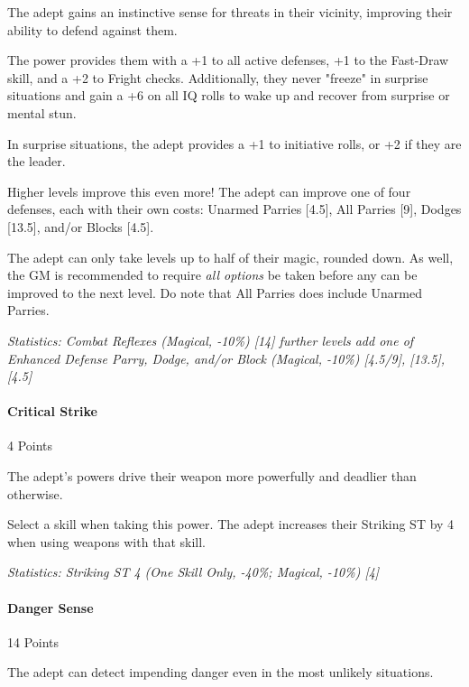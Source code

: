 \begin{multicols}{3}
	The adept gains an instinctive sense for threats in their vicinity, improving their ability to defend against them. 
	
	The power provides them with a +1 to all active defenses, +1 to the Fast-Draw skill, and a +2 to Fright checks. Additionally, they never "freeze" in surprise situations and gain a +6 on all IQ rolls to wake up and recover from surprise or mental stun.
	
	In surprise situations, the adept provides a +1 to initiative rolls, or +2 if they are the leader.
	
	Higher levels improve this even more! The adept can improve one of four defenses, each with their own costs: Unarmed Parries [4.5], All Parries [9], Dodges [13.5], and/or Blocks [4.5]. 
	
	The adept can only take levels up to half of their magic, rounded down. As well, the GM is recommended to require \textit{all options} be taken before any can be improved to the next level. Do note that All Parries does include Unarmed Parries.

	\textcolor{OliveGreen}{\textit{Statistics: Combat Reflexes (Magical, -10\%) [14] further levels add one of Enhanced Defense Parry, Dodge, and/or Block (Magical, -10\%) [4.5/9], [13.5], [4.5]}} 
	
	\paragraph{Critical Strike}
	\begin{flushright}
		4 Points
	\end{flushright}
	
	The adept's powers drive their weapon more powerfully and deadlier than otherwise. 
	
	Select a skill when taking this power. The adept increases their Striking ST by 4 when using weapons with that skill.
	
	\textcolor{OliveGreen}{\textit{Statistics: Striking ST 4 (One Skill Only, -40\%; Magical, -10\%) [4] }}
	
	\paragraph{Danger Sense}
	\begin{flushright}
		14 Points
	\end{flushright}

	The adept can detect impending danger even in the most unlikely situations. 
	

\end{multicols}
